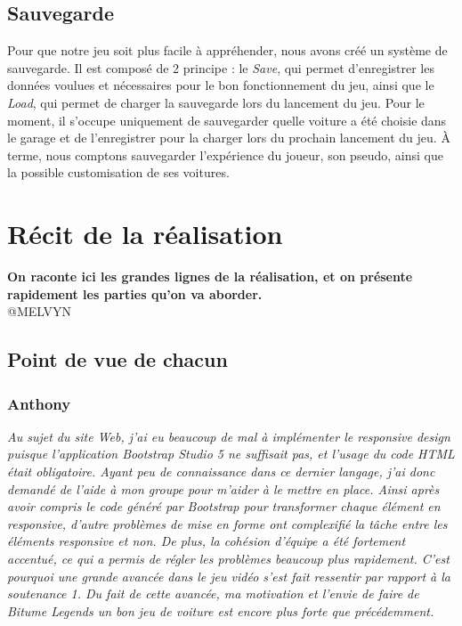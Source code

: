 \documentclass[12pt,a4paper]{article}
\begin{document}
            \subsection{Sauvegarde}
                Pour que notre jeu soit plus facile à appréhender, nous avons créé un système de 
                sauvegarde. Il est composé de 2 principe : le \textsl{Save}, qui permet d'enregistrer 
                les données voulues et nécessaires pour le bon fonctionnement du jeu, ainsi que le 
                \textsl{Load}, qui permet de charger la sauvegarde lors du lancement du jeu. Pour le 
                moment, il s'occupe uniquement de sauvegarder quelle voiture a été choisie dans le 
                garage et de l'enregistrer pour la charger lors du prochain lancement du jeu. À terme, 
                nous comptons sauvegarder l'expérience du joueur, son pseudo, ainsi que la possible 
                customisation de ses voitures.


    \clearpage
    \section{Récit de la réalisation}
        \textbf{On raconte ici les grandes lignes de la réalisation, et on présente rapidement les 
        parties qu'on va aborder.\\}
        \textsc{@MELVYN}


        \subsection{Point de vue de chacun}
            \subsubsection{Anthony}
                \textit{Au sujet du site Web, j'ai eu beaucoup de mal à implémenter le responsive design
                puisque l'application Bootstrap Studio 5 ne suffisait pas, et l'usage du code HTML était
                obligatoire. Ayant peu de connaissance dans ce dernier langage, j'ai donc demandé
                de l'aide à mon groupe pour m'aider à le mettre en place. Ainsi après avoir compris le
                code généré par Bootstrap pour transformer chaque élément en responsive, d'autre
                problèmes de mise en forme ont complexifié la tâche entre les éléments responsive et
                non. De plus, la cohésion d'équipe a été fortement accentué, ce qui a permis de régler 
                les problèmes beaucoup plus rapidement. C'est pourquoi une grande avancée dans le 
                jeu vidéo s'est fait ressentir par rapport à la soutenance 1. Du fait de cette avancée, 
                ma motivation et l'envie de faire de Bitume Legends un bon jeu de voiture est encore 
                plus forte que précédemment.}
\end{document}
